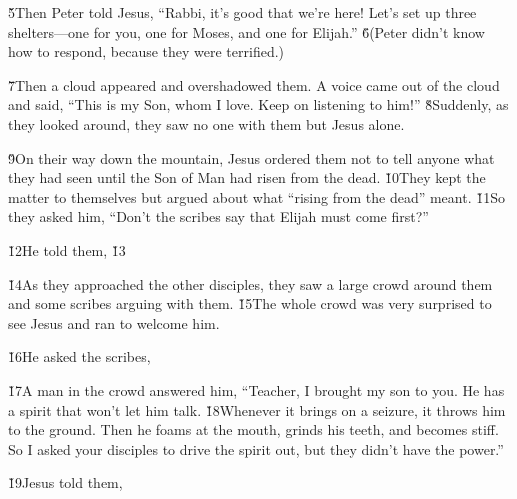 \v{5}Then Peter told Jesus, ``Rabbi, it's good that we're here! Let's set up three shelters---one for you, one for Moses, and one for Elijah.'' \v{6}(Peter didn't know how to respond, because they were terrified.)

\v{7}Then a cloud appeared and overshadowed them. A voice came out of the cloud and said, ``This is my Son, whom I love. Keep on listening to him!'' \v{8}Suddenly, as they looked around, they saw no one with them but Jesus alone.

\v{9}On their way down the mountain, Jesus ordered them not to tell anyone what they had seen until the Son of Man had risen from the dead. \v{10}They kept the matter to themselves but argued about what ``rising from the dead'' meant. \v{11}So they asked him, ``Don't the scribes say that Elijah must come first?''

\v{12}He told them,  \v{13} 

\v{14}As they approached the other disciples, they saw a large crowd around them and some scribes arguing with them. \v{15}The whole crowd was very surprised to see Jesus and ran to welcome him.

\v{16}He asked the scribes, 

\v{17}A man in the crowd answered him, ``Teacher, I brought my son to you. He has a spirit that won't let him talk. \v{18}Whenever it brings on a seizure, it throws him to the ground. Then he foams at the mouth, grinds his teeth, and becomes stiff. So I asked your disciples to drive the spirit out, but they didn't have the power.''

\v{19}Jesus told them, 

